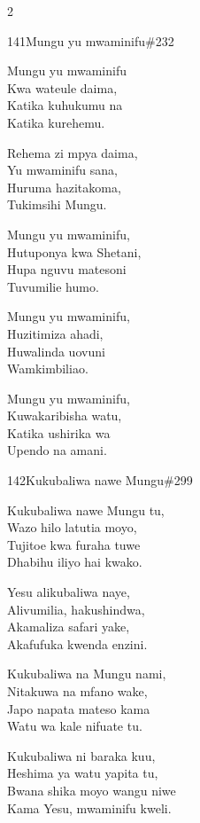 \documentclass{article}
\begin{document}
\begin{multicols}{2}
\begin{hymn}{141}{Mungu yu mwaminifu}{\#232}
\begin{stanza}
Mungu yu mwaminifu\\
Kwa wateule daima,\\
Katika kuhukumu na\\
Katika kurehemu.
\end{stanza}
\begin{chorus}
Rehema zi mpya daima,\\
Yu mwaminifu sana,\\
Huruma hazitakoma,\\
Tukimsihi Mungu.
\end{chorus}
\begin{stanza}
Mungu yu mwaminifu,\\
Hutuponya kwa Shetani,\\
Hupa nguvu matesoni\\
Tuvumilie humo.
\end{stanza}
\begin{stanza}
Mungu yu mwaminifu,\\
Huzitimiza ahadi,\\
Huwalinda uovuni\\
Wamkimbiliao.
\end{stanza}
\begin{stanza}
Mungu yu mwaminifu,\\
Kuwakaribisha watu,\\
Katika ushirika wa\\
Upendo na amani.
\end{stanza}
\end{hymn}

\begin{hymn}{142}{Kukubaliwa nawe Mungu}{\#299}
\begin{stanza}
Kukubaliwa nawe Mungu tu,\\
Wazo hilo latutia moyo,\\
Tujitoe kwa furaha tuwe\\
Dhabihu iliyo hai kwako.
\end{stanza}
\begin{stanza}
Yesu alikubaliwa naye,\\
Alivumilia, hakushindwa,\\
Akamaliza safari yake,\\
Akafufuka kwenda enzini.
\end{stanza}
\begin{stanza}
Kukubaliwa na Mungu nami,\\
Nitakuwa na mfano wake,\\
Japo napata mateso kama\\
Watu wa kale nifuate tu.
\end{stanza}
\begin{stanza}
Kukubaliwa ni baraka kuu,\\
Heshima ya watu yapita tu,\\
Bwana shika moyo wangu niwe\\
Kama Yesu, mwaminifu kweli.
\end{stanza}
\end{hymn}


\end{multicols}
\end{document}
